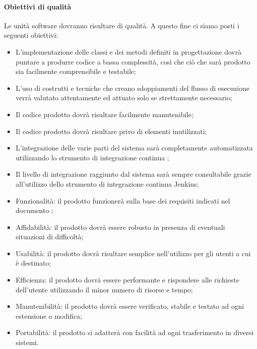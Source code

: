 \documentclass[../NormeDiProgetto_v3.0.0.tex]{subfiles}
\begin{document}
			\paragraph{Obiettivi di qualità}
			Le unità software dovranno risultare di qualità. A questo fine ci siamo posti i seguenti obiettivi:
			\begin{itemize}
				\item L'implementazione delle classi e dei metodi definiti in progettazione dovrà puntare a produrre codice a bassa complessità, così che ciò che sarà prodotto sia facilmente comprensibile e testabile;
				\item L'uso di costrutti e tecniche che creano sdoppiamenti del flusso di esecuzione verrà valutato attentamente ed attuato solo se strettamente necessario;
				\item Il codice prodotto dovrà risultare facilmente manutenibile;
				\item Il codice prodotto dovrà risultare privo di elementi inutilizzati;
				\item L'integrazione delle varie parti del sistema sarà completamente automatizzata utilizzando lo strumento di integrazione continua ;
				\item Il livello di integrazione raggiunto dal sistema sarà sempre consultabile grazie all'utilizzo dello strumento di integrazione continua Jenkins;
				\item Funzionalità: il prodotto funzionerà sulla base dei requisiti indicati nel documento \analisideirequisiti;
				\item Affidabilità: il prodotto dovrà essere robusto in presenza di eventuali situazioni di difficoltà;
				\item Usabilità: il prodotto dovrà risultare semplice nell'utilizzo per gli utenti a cui è destinato;
				\item Efficienza: il prodotto dovrà essere performante e rispondere alle richieste dell'utente utilizzando il minor numero di risorse e tempo;
				\item Manutenibilità: il prodotto dovrà essere verificato, stabile e testato ad ogni estensione o modifica;
				\item Portabilità: il prodotto si adatterà con facilità ad ogni trasferimento in diversi sistemi.
			\end{itemize}
\end{document}
